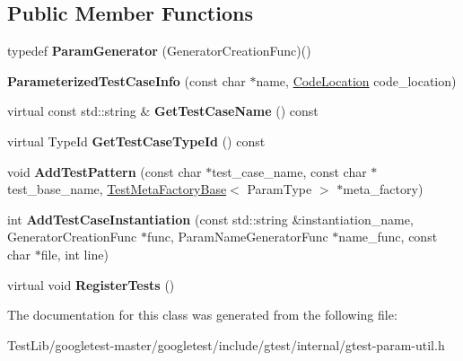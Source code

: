 \subsection*{Public Member Functions}
\begin{DoxyCompactItemize}
\item 
\mbox{\label{classtesting_1_1internal_1_1ParameterizedTestCaseInfo_a2f6a423f7ae8c7ac24b468538693aa26}} 
typedef {\bfseries Param\+Generator} (Generator\+Creation\+Func)()
\item 
\mbox{\label{classtesting_1_1internal_1_1ParameterizedTestCaseInfo_a6d19f368428260bd5c6e608b4d3fc6af}} 
{\bfseries Parameterized\+Test\+Case\+Info} (const char $\ast$name, \hyperlink{structtesting_1_1internal_1_1CodeLocation}{Code\+Location} code\+\_\+location)
\item 
\mbox{\label{classtesting_1_1internal_1_1ParameterizedTestCaseInfo_a8a9eafc7654b154165f131974397e200}} 
virtual const std\+::string \& {\bfseries Get\+Test\+Case\+Name} () const
\item 
\mbox{\label{classtesting_1_1internal_1_1ParameterizedTestCaseInfo_a16ed77e95a6042c722d0029744acfc33}} 
virtual Type\+Id {\bfseries Get\+Test\+Case\+Type\+Id} () const
\item 
\mbox{\label{classtesting_1_1internal_1_1ParameterizedTestCaseInfo_a3e557c888ec5e23b138c2ff254db15e5}} 
void {\bfseries Add\+Test\+Pattern} (const char $\ast$test\+\_\+case\+\_\+name, const char $\ast$test\+\_\+base\+\_\+name, \hyperlink{classtesting_1_1internal_1_1TestMetaFactoryBase}{Test\+Meta\+Factory\+Base}$<$ Param\+Type $>$ $\ast$meta\+\_\+factory)
\item 
\mbox{\label{classtesting_1_1internal_1_1ParameterizedTestCaseInfo_adefded091e3f20ac3a758029caea3eab}} 
int {\bfseries Add\+Test\+Case\+Instantiation} (const std\+::string \&instantiation\+\_\+name, Generator\+Creation\+Func $\ast$func, Param\+Name\+Generator\+Func $\ast$name\+\_\+func, const char $\ast$file, int line)
\item 
\mbox{\label{classtesting_1_1internal_1_1ParameterizedTestCaseInfo_a7e118820b3074ce70c0440e2e49a50a1}} 
virtual void {\bfseries Register\+Tests} ()
\end{DoxyCompactItemize}


The documentation for this class was generated from the following file\+:\begin{DoxyCompactItemize}
\item 
Test\+Lib/googletest-\/master/googletest/include/gtest/internal/gtest-\/param-\/util.\+h\end{DoxyCompactItemize}
